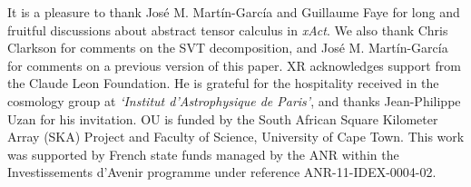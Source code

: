 \documentclass[notitlepage,onecolumn,floatfix,preprintnumbers,aps,prd,showpacs,nofootinbib,amsmath,amssymb,amsfonts]{revtex4-1}
\newcommand{\<}{\langle}
\renewcommand{\>}{\rangle}
\begin{document}
\acknowledgements

It is a pleasure to thank Jos\'e M. Mart\'in-Garc\'ia and Guillaume Faye for long and fruitful discussions about 
abstract tensor calculus in \textit{xAct}. We also thank Chris Clarkson for comments on the SVT decomposition, 
and Jos\'e M. Mart\'in-Garc\'ia for comments on a previous version of this paper. 
XR acknowledges support from the Claude Leon Foundation. He is grateful for the hospitality received in the 
cosmology group at \textit{`Institut d'Astrophysique de Paris'}, and thanks Jean-Philippe Uzan for his invitation. 
OU is funded by the South African Square Kilometer Array (SKA) Project and Faculty of Science, University of Cape Town. 
This work was supported by French state funds managed by the ANR within the Investissements d'Avenir programme under reference ANR-11-IDEX-0004-02.



\end{document}
